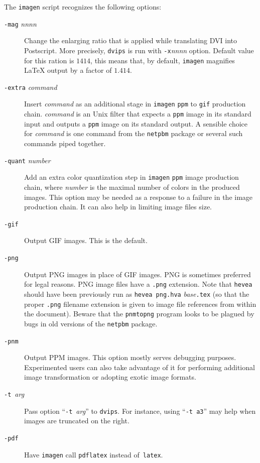 The \texttt{imagen} script recognizes the following options:
\begin{description}
\item[{\tt -mag} {\sl nnnn}] Change the enlarging ratio that is applied
while translating DVI into Postscript.
More precisely,  \texttt{dvips} is run with \texttt{-x}{\sl nnnn}
option.
Default value for this ration is $1414$, this means
that, by default, \texttt{imagen} magnifies \LaTeX{} output by a factor of
$1.414$.
\item[{\tt -extra} {\it command}] Insert {\it command} as an additional
stage in \texttt{imagen} \texttt{ppm} to \texttt{gif} production chain.
\textit{command} is an Unix filter that expects a \texttt{ppm} image
in its standard input and outputs a \texttt{ppm} image on its standard output.
A sensible choice for \textit{command} is one command from the
\texttt{netpbm} package or several such commands piped together.
\item[{\tt -quant} {\it number}] Add an extra color quantization step
in \texttt{imagen} \texttt{ppm} image production chain, where
\textit{number} is the maximal number of colors in the produced
images. This option may be needed as a response to a failure in the
image production chain. It can also help in limiting image files size.
\item[{\tt -gif}] Output GIF images. This is the default.
\item[{\tt -png}]
Output PNG images in place of GIF images.
PNG is sometimes preferred for legal reasons.
PNG image files have a \texttt{.png} extension.
Note that \texttt{hevea} should have been previously run as
\texttt{hevea png.hva} \textit{base}\texttt{.tex} (so that the proper
\texttt{.png} filename
extension is given to image file references from within the \html{}
document).
Beware that the \texttt{pnmtopng} program looks to be plagued by bugs
in old versions of the \texttt{netpbm} package.
\item[{\tt -pnm}] Output PPM images. This option mostly serves
debugging purposes. Experimented users can also take advantage
of it for performing additional image transformation or
adopting exotic image formats.
\item[{\tt -t}~{\it arg}] Pass option ``{\tt -t}~{\it arg}'' to
\texttt{dvips}.
For instance, using ``\texttt{-t a3}'' may help when images are
truncated on the right.
\item[{\tt -pdf}]
Have \texttt{imagen} call \texttt{pdflatex} instead
of~\texttt{latex}.
\end{description}

